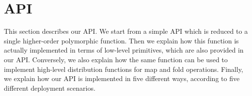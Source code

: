 \documentclass{llncs}
\newcommand{\Ocaml}{OCaml}
\begin{document}

\section{API}\label{sec:API}

This section describes our API. 
We start from a simple API which is reduced to a single higher-order
polymorphic function.
Then we explain how this function is actually implemented in terms of
low-level primitives, which are also provided in our API.
Conversely, we also explain how the same function can
be used to implement high-level distribution functions for map and
fold operations. Finally, we explain how our API is
implemented in five different ways, according to five different deployment
scenarios. 
\end{document}
